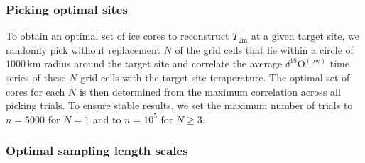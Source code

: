 \documentclass[cp, manuscript]{copernicus}
\begin{document}


\subsubsection{Picking optimal sites}\label{methods:picking}

To obtain an optimal set of ice cores to reconstruct $T_{2\mathrm{m}}$ at a
given target site, we randomly pick without replacement $N$ of the
grid cells that lie within a circle of $1000$\,km radius around the target site
and correlate the average $\delta^{18}\mathrm{O}^{\mathrm{(pw)}}$ time series of
these $N$ grid cells with the target site temperature. The optimal set of cores
for each $N$ is then determined from the maximum correlation across all picking
trials. To ensure stable results, we set the maximum number of trials to
$n=5000$ for $N=1$ and to $n=10^5$ for $N\geq3$.

\subsubsection{Optimal sampling length scales}\label{methods:opt.sampling}
\end{document}
